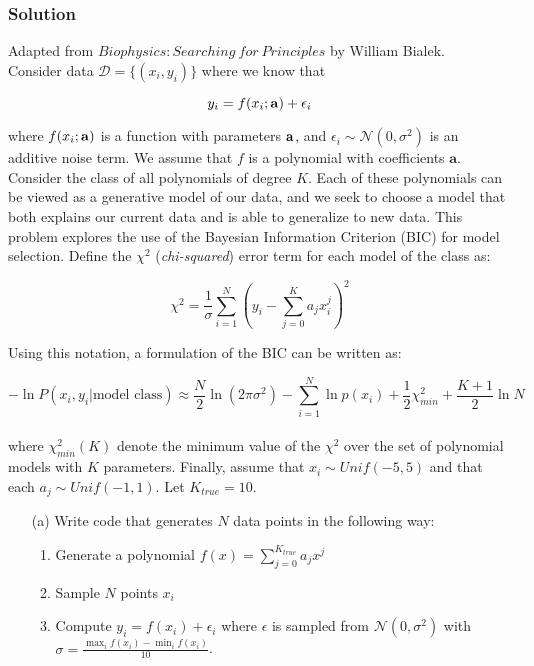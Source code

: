 \documentclass[submit]{harvardml}
\begin{document}
\subsubsection*{Solution}


\newpage
\begin{problem}

Adapted from $Biophysics: Searching\ for\ Principles$ by William Bialek.\\

\noindent Consider data $\mathcal{D} = \{(x_i, y_i)\}$ where we know that

    $$y_i = f(x_i ; \bold{a}) + \epsilon_i$$

\noindent where $f(x_i ; \bold{a})$ is a function with parameters $\bold{a}$, and $\epsilon_i \sim \mathcal{N}(0,\sigma^2)$ is an additive noise term.
We assume that $f$ is a polynomial with coefficients $\mathbf{a}$.
Consider the class of all polynomials of degree $K$. Each of these polynomials can be viewed as a generative model of our data, and we seek
to choose a model that both explains our current data and is able to generalize to new data. This problem explores the use of the Bayesian Information Criterion (BIC)
for model selection. Define the $\chi^2$ (\textit{chi-squared}) error term for each model of the class as:

$$\chi^2 =  \frac{1}{\sigma} \sum_{i=1}^N \left( y_i - \sum_{j=0}^K a_j x_i^j \right)^2 $$

\noindent Using this notation, a formulation of the BIC can be written as: 

$$-\ln P({x_i,y_i} | \text{model class} ) \approx \frac{N}{2} \ln (2\pi \sigma^2) - \sum_{i=1}^N \ln p(x_i) + \frac{1}{2} \chi^2_{min} + \frac{K+1}{2} \ln N $$ \\

\noindent where $\chi^2_{min}(K)$ denote the minimum value of the $\chi^2$ over the set of polynomial models with $K$ parameters. 
Finally, assume that $x_i \sim Unif(-5,5)$ and that each $a_j \sim Unif(-1,1)$. Let $K_{true} = 10$.

    \begin{itemize}
    
        \item[(a)] Write code that generates $N$ data points in the following way:
            \begin{enumerate}
                \item Generate a polynomial $f(x) = \sum_{j = 0}^{K_{true}} a_j x^j$ 
                \item Sample $N$ points $x_i$
                \item Compute $y_i = f(x_i) + \epsilon_i$ where $\epsilon$ is sampled from $\mathcal{N}(0, \sigma^2)$ with $\sigma = \frac{ \max_i f(x_i) - \min_i f(x_i) }{10}$.
            \end{enumerate}
        

\end{itemize}
\end{problem}
\end{document}
